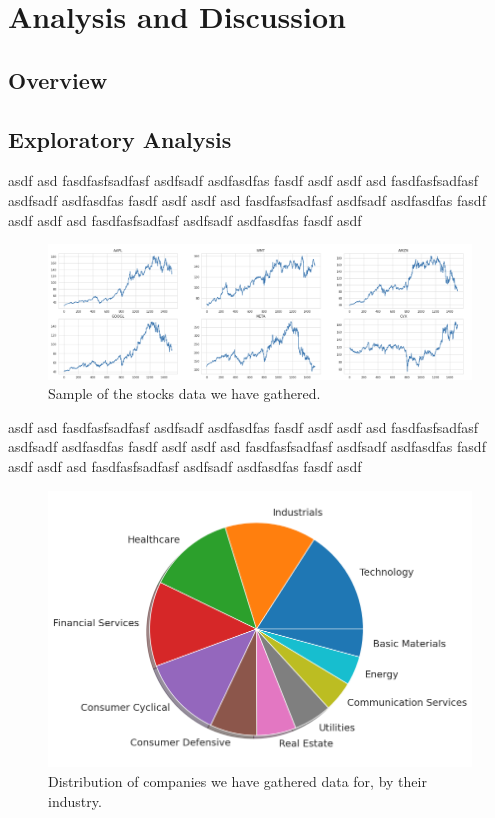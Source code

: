 \documentclass[12pt]{article}
\begin{document}
\section{Analysis and Discussion}

\subsection{Overview}

\subsection{Exploratory Analysis}

asdf asd fasdfasfsadfasf asdfsadf asdfasdfas fasdf asdf
asdf asd fasdfasfsadfasf asdfsadf asdfasdfas fasdf asdf
asdf asd fasdfasfsadfasf asdfsadf asdfasdfas fasdf asdf
asdf asd fasdfasfsadfasf asdfsadf asdfasdfas fasdf asdf

\begin{figure}[H]
\caption{Sample of the stocks data we have gathered.}
\centering
\includegraphics[width=12cm]{img/stocks.png} 
\end{figure}

asdf asd fasdfasfsadfasf asdfsadf asdfasdfas fasdf asdf
asdf asd fasdfasfsadfasf asdfsadf asdfasdfas fasdf asdf
asdf asd fasdfasfsadfasf asdfsadf asdfasdfas fasdf asdf
asdf asd fasdfasfsadfasf asdfsadf asdfasdfas fasdf asdf


\begin{figure}[H]
\caption{Distribution of companies we have gathered data for, by their industry.}
\centering
\includegraphics[width=12cm]{img/industries.png} 
\end{figure}
\end{document}
